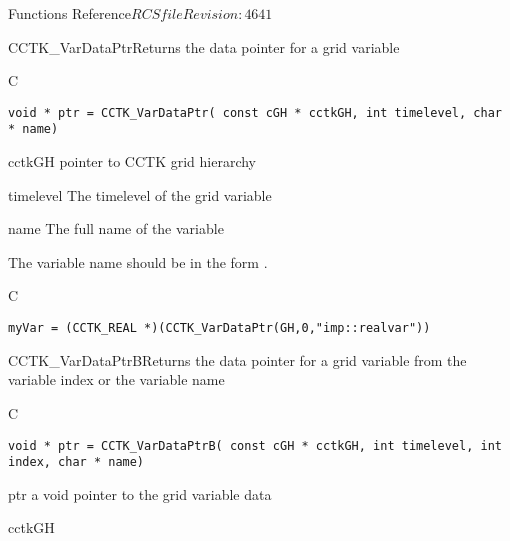 \begin{cactuspart}{ Functions Reference}{$RCSfile$}{$Revision: 4641 $}



\begin{FunctionDescription}{CCTK\_VarDataPtr}{Returns the data pointer for a grid variable}
\label{CCTK-VarDataPtr}
\begin{SynopsisSection}
\begin{Synopsis}{C}
\begin{verbatim}void * ptr = CCTK_VarDataPtr( const cGH * cctkGH, int timelevel, char * name)\end{verbatim}
\end{Synopsis}
\end{SynopsisSection}
\begin{ParameterSection}
\begin{Parameter}{cctkGH}
pointer to CCTK grid hierarchy
\end{Parameter}
\begin{Parameter}{timelevel}
The timelevel of the grid variable
\end{Parameter}
\begin{Parameter}{name}
The full name of the variable
\end{Parameter}
\end{ParameterSection}
\begin{Discussion}
The variable name should be in the form .
\end{Discussion}
\begin{ExampleSection}
\begin{Example}{C}
\begin{verbatim}
myVar = (CCTK_REAL *)(CCTK_VarDataPtr(GH,0,"imp::realvar"))
\end{verbatim}
\end{Example}
\end{ExampleSection}
\end{FunctionDescription}

\begin{FunctionDescription}{CCTK\_VarDataPtrB}{Returns the data pointer for a grid variable from the variable index or the variable name}
\label{CCTK-VarDataPtrB}
\begin{SynopsisSection}
\begin{Synopsis}{C}
\begin{verbatim}void * ptr = CCTK_VarDataPtrB( const cGH * cctkGH, int timelevel, int index, char * name)\end{verbatim}
\end{Synopsis}
\end{SynopsisSection}
\begin{ParameterSection}
\begin{Parameter}{ptr}
a void pointer to the grid variable data
\end{Parameter}
\begin{Parameter}{cctkGH}


\end{Parameter}
\end{ParameterSection}
\end{FunctionDescription}
\end{cactuspart}
